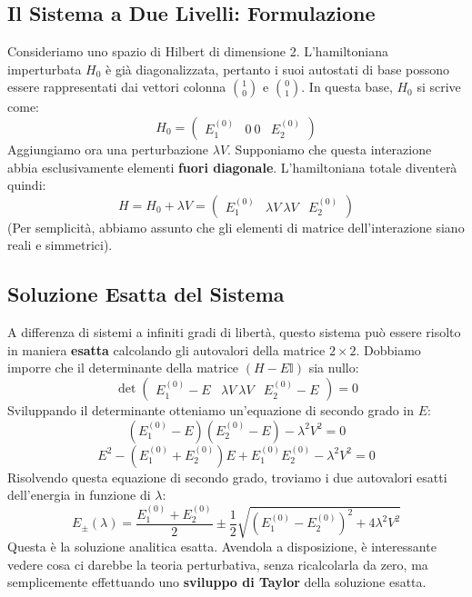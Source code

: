 \subsection{Il Sistema a Due Livelli: Formulazione}
Consideriamo uno spazio di Hilbert di dimensione 2. L'hamiltoniana imperturbata $H_0$ è già diagonalizzata, pertanto i suoi autostati di base possono essere rappresentati dai vettori colonna $\binom{1}{0}$ e $\binom{0}{1}$. In questa base, $H_0$ si scrive come:
\begin{equation}
H_0 = \begin{pmatrix}
E_1^{(0)} & 0 \
0 & E_2^{(0)}
\end{pmatrix}
\end{equation}
Aggiungiamo ora una perturbazione $\lambda V$. Supponiamo che questa interazione abbia esclusivamente elementi \textbf{fuori diagonale}. L'hamiltoniana totale diventerà quindi:
\begin{equation}
H = H_0 + \lambda V = \begin{pmatrix}
E_1^{(0)} & \lambda V \
\lambda V & E_2^{(0)}
\end{pmatrix}
\end{equation}
(Per semplicità, abbiamo assunto che gli elementi di matrice dell'interazione siano reali e simmetrici).

\subsection{Soluzione Esatta del Sistema}
A differenza di sistemi a infiniti gradi di libertà, questo sistema può essere risolto in maniera \textbf{esatta} calcolando gli autovalori della matrice $2 \times 2$. Dobbiamo imporre che il determinante della matrice $(H - E\mathbb{I})$ sia nullo:
\begin{equation}
\det \begin{pmatrix}
E_1^{(0)} - E & \lambda V \
\lambda V & E_2^{(0)} - E
\end{pmatrix} = 0
\end{equation}
Sviluppando il determinante otteniamo un'equazione di secondo grado in $E$:
\begin{equation}
(E_1^{(0)} - E)(E_2^{(0)} - E) - \lambda^2 V^2 = 0
\end{equation}
\begin{equation}
E^2 - (E_1^{(0)} + E_2^{(0)})E + E_1^{(0)}E_2^{(0)} - \lambda^2 V^2 = 0
\end{equation}
Risolvendo questa equazione di secondo grado, troviamo i due autovalori esatti dell'energia in funzione di $\lambda$:
\begin{equation}
E_{\pm}(\lambda) = \frac{E_1^{(0)} + E_2^{(0)}}{2} \pm \frac{1}{2} \sqrt{(E_1^{(0)} - E_2^{(0)})^2 + 4\lambda^2 V^2}
\end{equation}
Questa è la soluzione analitica esatta. Avendola a disposizione, è interessante vedere cosa ci darebbe la teoria perturbativa, senza ricalcolarla da zero, ma semplicemente effettuando uno \textbf{sviluppo di Taylor} della soluzione esatta.

